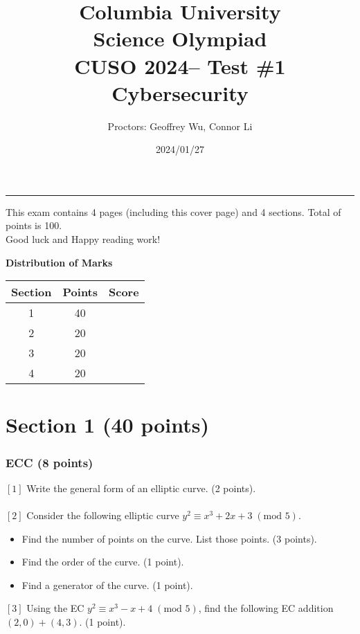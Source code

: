 \documentclass[letterpaper,12pt,addpoints]{exam}
\newcommand{\university}{Columbia University}
\newcommand{\faculty}{Science Olympiad}
\newcommand{\class}{CUSO 2024}
\newcommand{\examnum}{Test \#1}
\newcommand{\content}{Cybersecurity}
\newcommand{\examdate}{2024/01/27}
\begin{document}
\title{\Large \textbf{\university\\ \faculty\\
\bigskip
\class -- \examnum \\ \content}}
\author{Proctors: Geoffrey Wu, Connor Li}
\date{\examdate}
\maketitle
\begin{flushleft}
\medskip
{}
\end{flushleft}
\noindent \rule{\textwidth}{1pt}

\noindent This exam contains 4 pages (including this cover page) and 4 sections. Total of points is 100.\\
Good luck and Happy reading work!

\begin{center}
\textbf{Distribution of Marks}\\
\end{center}
\begin{center}
\begin{tabular} {| c | c | c |}
    \hline
    Section & Points & Score \\
    \hline
    1 & 40 & \\
    \hline
    2 & 20 & \\
    \hline
    3 & 20 & \\
    \hline
    4 & 20 & \\
    \hline
\end{tabular}
\end{center}
\clearpage

\section*{Section 1 (40 points)}
\subsubsection*{ECC (8 points)}
$[1]$ Write the general form of an elliptic curve. (2 points).\\
\\
$[2]$ Consider the following elliptic curve $y^2 \equiv x^3 + 2x + 3\;(\text{mod } 5)$. 
\begin{itemize}
    \item Find the number of points on the curve. List those points. (3 points).
    \item Find the order of the curve. (1 point).
    \item Find a generator of the curve. (1 point).
\end{itemize}
$[3]$ Using the EC $y^2 \equiv x^3 - x + 4 \;(\text{mod } 5)$, find the following EC addition $(2,0) + (4,3)$. (1 point).
\end{document}
